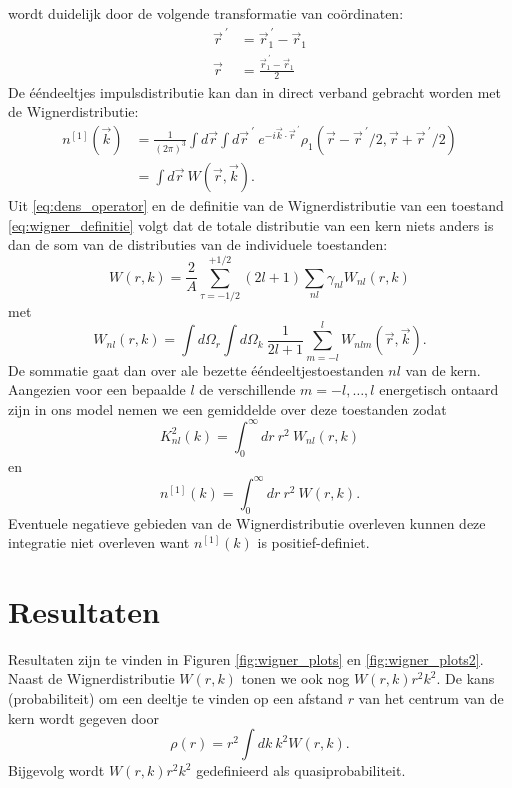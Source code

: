 \documentclass[11pt,twoside]{book}
\begin{document}
wordt duidelijk door de volgende transformatie van co\"{o}rdinaten:
\begin{align*}
\vec{r}^{\ \prime} & = \vec{r}^{\ \prime}_1-\vec{r}_1 \\
\vec{r} & = \frac{\vec{r}^{\ \prime}_1-\vec{r}_1}{2}
\end{align*}
De \'{e}\'{e}ndeeltjes impulsdistributie kan dan in direct verband gebracht worden met de Wignerdistributie:
\begin{align} \label{eq:voorwaarde}
n^{[1]}(\vec{k}) & =\frac{1}{(2\pi)^3}\int d\vec{r} \int d\vec{r}^{\ \prime}\  e^{-i\vec{k}\cdot\vec{r}^{\ \prime}}\rho_1(\vec{r}-\vec{r}^{\ \prime}/2,\vec{r}+\vec{r}^{\ \prime}/2) \nonumber \\
& = \int d\vec{r}\  W(\vec{r},\vec{k}).
\end{align}
Uit \eqref{eq:dens_operator} en de definitie van de Wignerdistributie van een toestand \eqref{eq:wigner_definitie} volgt dat de totale distributie van een kern niets anders is dan de som van de distributies van de individuele toestanden:
\begin{equation} \label{eq:wigner_magnitude}
 W(r,k) = \frac{2}{A}\sum_{\tau = -1/2}^{+1/2} (2l+1) \sum_{nl} \gamma_{nl} W_{nl}(r,k) 
\end{equation}
met 
\begin{equation} \label{eq:wigner_level}
W_{nl}(r,k) = \int d\Omega_r \int d\Omega_k\ \frac{1}{2l+1} \sum_{m= -l}^{l}W_{nlm}(\vec{r},\vec{k}).
\end{equation}
De sommatie gaat dan over ale bezette \'{e}\'{e}ndeeltjestoestanden $nl$ van de kern. Aangezien voor een bepaalde $l$ de verschillende $m  = -l, \ldots, l$ energetisch ontaard zijn in ons model nemen we een gemiddelde over deze toestanden zodat
\begin{equation}
K^{2}_{nl}(k) =   \int_0^\infty dr\ r^2\ W_{nl}(r,k)
\end{equation}
en
\begin{equation} \label{eq:voorwaarde_2}
n^{[1]}(k) =  \int_0^\infty dr\ r^2\  W(r,k).
\end{equation}
Eventuele negatieve gebieden van de Wignerdistributie overleven kunnen deze integratie niet overleven want $n^{[1]}(k)$ is positief-definiet. 
\section{Resultaten}



Resultaten zijn te vinden in Figuren \ref{fig:wigner_plots} en \ref{fig:wigner_plots2}. Naast de Wignerdistributie $W(r,k)$ tonen we ook nog $W(r,k)r^2 k^2$. De kans (probabiliteit) om een deeltje te vinden op een afstand $r$ van het centrum van de kern wordt gegeven door 
\begin{equation}
\rho (r) = r^2 \int dk\ k^2 W(r,k).
\end{equation}
Bijgevolg wordt $W(r,k)r^2 k^2$ gedefinieerd als quasiprobabiliteit.
\end{document}
